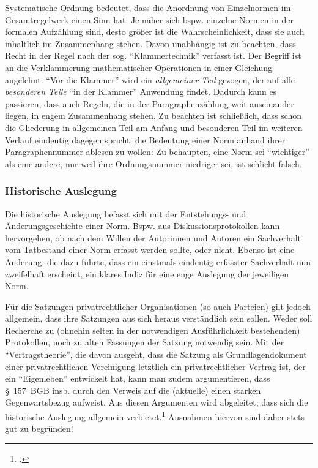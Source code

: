 Systematische Ordnung bedeutet, dass die Anordnung von Einzelnormen im Gesamtregelwerk einen Sinn hat. Je näher sich bspw. einzelne Normen in der formalen Aufzählung sind, desto größer ist die Wahrscheinlichkeit, dass sie auch inhaltlich im Zusammenhang stehen. Davon unabhängig ist zu beachten, dass Recht in der Regel nach der sog. \enquote{Klammertechnik} verfasst ist. Der Begriff ist an die Verklammerung mathematischer Operationen in einer Gleichung angelehnt: \enquote{Vor die Klammer} wird ein \emph{allgemeiner Teil} gezogen, der auf alle \emph{besonderen Teile} \enquote{in der Klammer} Anwendung findet. Dadurch kann es passieren, dass auch Regeln, die in der Paragraphenzählung weit auseinander liegen, in engem Zusammenhang stehen. Zu beachten ist schließlich, dass schon die Gliederung in allgemeinen Teil am Anfang und besonderen Teil im weiteren Verlauf eindeutig dagegen spricht, die Bedeutung einer Norm anhand ihrer Paragraphennummer ablesen zu wollen: Zu behaupten, eine Norm sei \enquote{wichtiger} als eine andere, nur weil ihre Ordnungsnummer niedriger sei, ist schlicht falsch. 

\subsubsection{Historische Auslegung}
Die historische Auslegung befasst sich mit der Entstehungs- und Änderungsgeschichte einer Norm. Bspw. aus Diskussionsprotokollen kann hervorgehen, ob nach dem Willen der Autorinnen und Autoren ein Sachverhalt vom Tatbestand einer Norm erfasst werden sollte, oder nicht. Ebenso ist eine Änderung, die dazu führte, dass ein einstmals eindeutig erfasster Sachverhalt nun zweifelhaft erscheint, ein klares Indiz für eine enge Auslegung der jeweiligen Norm.

Für die Satzungen privatrechtlicher Organisationen (so auch Parteien) gilt jedoch allgemein, dass ihre Satzungen aus sich heraus verständlich sein sollen. Weder soll Recherche zu (ohnehin selten in der notwendigen Ausführlichkeit bestehenden) Protokollen, noch zu alten Fassungen der Satzung notwendig sein. Mit der \enquote{Vertragstheorie}, die davon ausgeht, dass die Satzung als Grundlagendokument einer privatrechtlichen Vereinigung letztlich ein privatrechtlicher Vertrag ist, der ein \enquote{Eigenleben} entwickelt hat, kann man zudem argumentieren, dass \S~157~BGB insb. durch den Verweis auf die (aktuelle)  einen starken Gegenwartsbezug aufweist. Aus diesen Argumenten wird abgeleitet, dass sich die historische Auslegung allgemein verbietet.\footnote{\cite[Rn.~36]{sauter2010}.} Ausnahmen hiervon sind daher stets gut zu begründen!

